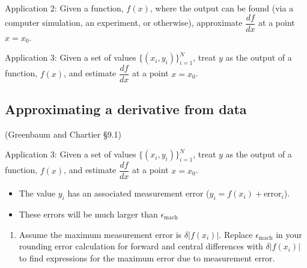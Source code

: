 \documentclass[12pt,letterpaper,noanswers]{exam}
\begin{document}
\noindent Application 2: Given a function, $f(x)$, where the output can be found (via a computer simulation, an experiment, or otherwise), approximate $\dfrac{df}{dx}$ at a point $x = x_0$.

\noindent Application 3: Given a set of values $\{(x_i,y_i)\}_{i=1}^N$, treat $y$ as the output of a function, $f(x)$, and estimate $\dfrac{df}{dx}$ at a point $x = x_0$.

\subsection*{Approximating a derivative from data}
\begin{tcolorbox}
(Greenbaum and Chartier \S 9.1)

Application 3: Given a set of values $\{(x_i,y_i)\}_{i=1}^N$, treat $y$ as the output of a function, $f(x)$, and estimate $\dfrac{df}{dx}$ at a point $x = x_0$.
\begin{itemize}
\itemsep0pt
    \item The value $y_i$ has an associated measurement error ($y_i = f(x_i) + \text{error}_i$).
    \item These errors will be much larger than $\epsilon_{\text{mach}}$
\end{itemize}
\end{tcolorbox}
\begin{enumerate}[resume=classQ]
\item Assume the maximum measurement error is $\delta \vert f(x_i)\vert$.  Replace $\epsilon_{\text{mach}}$ in your rounding error calculation for forward and central differences with $\delta \vert f(x_i)\vert$ to find expressions for the maximum error due to measurement error.

\vspace{1in}


\end{enumerate}
\end{document}
